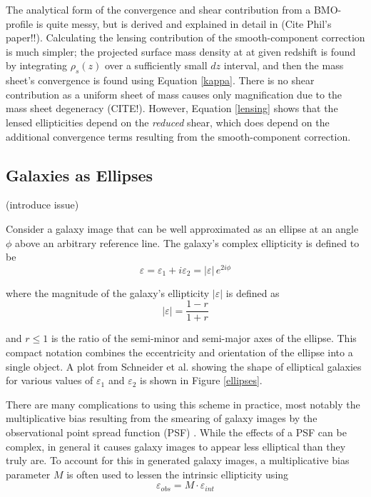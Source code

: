 \documentclass[%
 reprint,
 amsmath,amssymb,
 aps,nofootinbib
]{revtex4-1}
\begin{document}
 The analytical form of the convergence and shear contribution from a BMO-profile is quite messy, but is derived and explained in detail in (Cite Phil's paper!!). Calculating the lensing contribution of the smooth-component correction is much simpler; the projected surface mass density at at given redshift is found by integrating $\rho_s(z)$ over a sufficiently small $dz$ interval, and then the mass sheet's convergence is found using Equation \eqref{kappa}. There is no shear contribution as a uniform sheet of mass causes only magnification due to the mass sheet degeneracy (CITE!). However, Equation \eqref{lensing} shows that the lensed ellipticities depend on the \textit{reduced} shear, which does depend on the additional convergence terms resulting from the smooth-component correction.

\subsection{Galaxies as Ellipses}

(introduce issue)

Consider a galaxy image that can be well approximated as an ellipse at an angle $\phi$ above an arbitrary reference line. The galaxy's complex ellipticity is defined to be
\begin{equation}\label{complex_ellipticity}
\varepsilon=\varepsilon_1+i\varepsilon_2=|\varepsilon|\,e^{2i\phi}
\end{equation}

\noindent where the magnitude of the galaxy's ellipticity $|\varepsilon|$ is defined as
\begin{equation}
|\varepsilon|=\frac{1-r}{1+r}
\end{equation}

\noindent and $r\leq1$ is the ratio of the semi-minor and semi-major axes of the ellipse. This compact notation combines the eccentricity and orientation of the ellipse into a single object. A plot from Schneider et al. \cite{schneider} showing the shape of elliptical galaxies for various values of $\varepsilon_1$ and $\varepsilon_2$ is shown in Figure \ref{ellipses}.

There are many complications to using this scheme in practice, most notably the multiplicative bias resulting from the smearing of galaxy images by the observational point spread function (PSF) \cite{multiplicative_bias}. While the effects of a PSF can be complex, in general it causes galaxy images to appear less elliptical than they truly are. To account for this in generated galaxy images, a multiplicative bias parameter $M$ is often used to lessen the intrinsic ellipticity using
$$\varepsilon_{obs}=M\cdot\varepsilon_{int}$$
\end{document}
